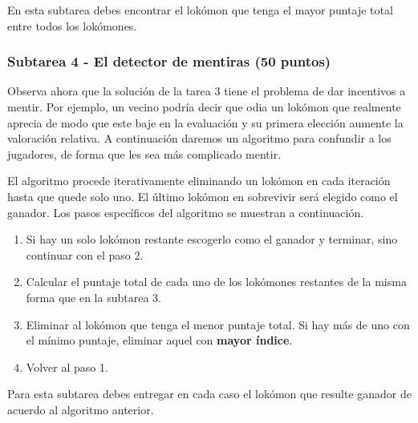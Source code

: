 \documentclass{oci}
\begin{document}
\begin{outputDescription}

En esta subtarea debes encontrar el lokómon que tenga el mayor puntaje total
entre todos los lokómones.

\begin{sampleDescription}
\end{sampleDescription}

\subsubsection*{Subtarea 4 - El detector de mentiras (50 puntos)}
Observa ahora que la solución de la tarea 3 tiene el problema de dar incentivos
a mentir.
Por ejemplo, un vecino podría decir que odia un lokómon que realmente aprecia de
modo que este baje en la evaluación y su primera elección aumente la
valoración relativa. 
A continuación daremos un algoritmo para confundir a los jugadores, de forma que
les sea más complicado mentir.

El algoritmo procede iterativamente eliminando un lokómon en cada iteración
hasta que quede solo uno.
El último lokómon en sobrevivir será elegido como el ganador.
Los pasos específicos del algoritmo se muestran a continuación.

\begin{enumerate}
	\item Si hay un solo lokómon restante escogerlo como el ganador y terminar,
    sino continuar con el paso 2.
	\item Calcular el puntaje total de cada uno de los lokómones restantes de
    la misma forma que en la subtarea 3.
	\item Eliminar al lokómon que tenga el menor puntaje total.
    Si hay más de uno con el mínimo puntaje, eliminar aquel con \textbf{mayor
      índice}.
	\item Volver al paso 1.
\end{enumerate}

Para esta subtarea debes entregar en cada caso el lokómon que resulte ganador de
acuerdo al algoritmo anterior.

\begin{sampleDescription}
\end{sampleDescription}

\end{outputDescription}
\end{document}
